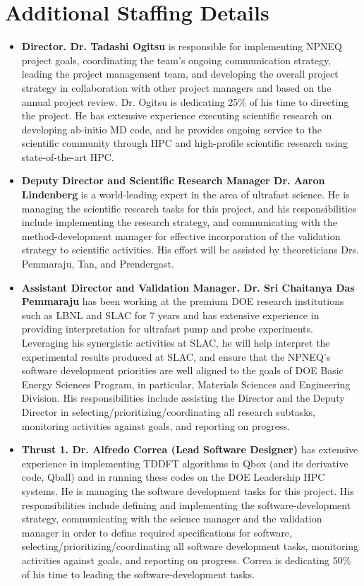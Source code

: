\section{Additional Staffing Details}
\label{sec:appendixb}
\begin{itemize}
    \item[]{\bf Director. Dr. Tadashi Ogitsu} is responsible for implementing NPNEQ project goals, coordinating the team’s ongoing communication strategy, leading the project management team, and developing the overall project strategy in collaboration with other project managers and based on the annual project review. Dr. Ogitsu is dedicating 25\% of his time to directing the project. He has extensive experience executing scientific research on developing ab-initio MD code, and he provides ongoing service to the scientific community through HPC and high-profile scientific research using state-of-the-art HPC. 
    
    \item[]{\bf Deputy Director and Scientific Research Manager Dr. Aaron Lindenberg} is a world-leading expert in the area of ultrafast science. He is managing the scientific research tasks for this project, and his responsibilities include implementing the research strategy, and communicating with the method-development manager for effective incorporation of the validation strategy to scientific activities. His effort will be assisted by theoreticians Drs. Pemmaraju, Tan, and Prendergast. 
    
    \item[]{\bf Assistant Director and Validation Manager. Dr. Sri Chaitanya Das Pemmaraju} has been working at the premium DOE research institutions such as LBNL and SLAC for 7 years and has extensive experience in providing interpretation for ultrafast pump and probe experiments. Leveraging his synergistic activities at SLAC, he will help interpret the experimental results produced at SLAC, and ensure that the NPNEQ’s software development priorities are well aligned to the goals of DOE Basic Energy Sciences Program, in particular, Materials Sciences and Engineering Division. His responsibilities include assisting the Director and the Deputy Director in selecting/prioritizing/coordinating all research subtasks, monitoring activities against goals, and reporting on progress.
    
    \item[]{\bf Thrust 1. Dr. Alfredo Correa (Lead Software Designer)} has extensive experience in implementing TDDFT algorithms in Qbox (and its derivative code, Qball) and in running these codes on the DOE Leadership HPC systems. He is managing the software development tasks for this project. His responsibilities include defining and implementing the software-development strategy, communicating with the science manager and the validation manager in order to define required specifications for software, selecting/prioritizing/coordinating all software development tasks, monitoring activities against goals, and reporting on progress. Correa is dedicating 50\% of his time to leading the software-development tasks.
    

\end{itemize}

